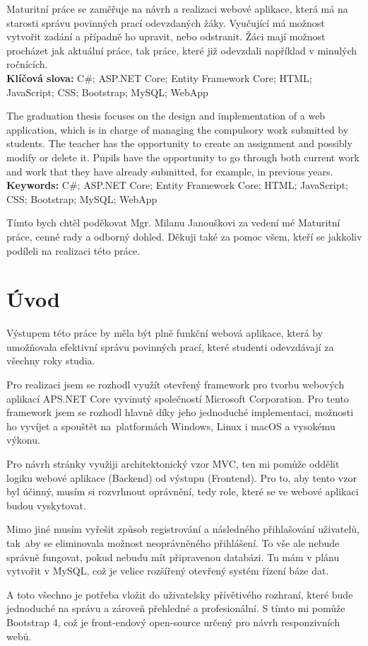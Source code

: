 \documentclass[a4paper, 12pt]{report}
\begin{document}
	\titulniStrana
	
	\anotace Maturitní práce se zaměřuje na návrh a realizaci webové aplikace, která má na starosti správu povinných prací odevzdaných žáky. Vyučující má možnost vytvořit zadání a případně ho upravit, nebo odstranit. Žáci mají možnost procházet jak aktuální práce, tak práce, které již odevzdali například v minulých ročnících. \\
	\textbf{Klíčová slova: } C\#; ASP.NET Core; Entity Framework Core; HTML; JavaScript; CSS; Bootstrap; MySQL; WebApp

	\annotation The graduation thesis focuses on the design and implementation of a web application, which is in charge of managing the compulsory work submitted by students. The teacher has the opportunity to create an assignment and possibly modify or delete it. Pupils have the opportunity to go through both current work and work that they have already submitted, for example, in previous years.\\
	\textbf{Keywords: } C\#; ASP.NET Core; Entity Framework Core; HTML; JavaScript; CSS; Bootstrap; MySQL; WebApp

	\podekovani Tímto bych chtěl poděkovat Mgr. Milanu Janouškovi za vedení mé Maturitní práce, cenné rady a odborný dohled. Děkuji také za pomoc všem, kteří se jakkoliv podíleli na realizaci této práce.
	
	\obsah

	\chapter{Úvod}
    Výstupem této práce by měla být plně funkční webová aplikace, která by umožňovala efektivní správu povinných prací, které studenti odevzdávají za všechny roky studia.\par
	Pro realizaci jsem se rozhodl využít otevřený framework pro tvorbu webových aplikací APS.NET Core vyvinutý společností Microsoft Corporation. Pro tento framework jsem se rozhodl hlavně díky jeho jednoduché implementaci, možnosti ho vyvíjet a spouštět na~platformách Windows, Linux i macOS a vysokému výkonu.\par
	Pro návrh stránky využiji architektonický vzor MVC, ten mi pomůže oddělit logiku webové aplikace (Backend) od výstupu (Frontend). Pro to, aby tento vzor byl účinný, musím si rozvrhnout oprávnění, tedy role, které se ve webové aplikaci budou vyskytovat.\par
	Mimo jiné musím vyřešit způsob registrování a následného přihlašování uživatelů, tak~aby se eliminovala možnost neoprávněného přihlášení. To vše ale nebude správně fungovat, pokud nebudu mít připravenou databázi. Tu mám v plánu vytvořit v MySQL, což je velice rozšířený otevřený systém řízení báze dat.\par
	A toto všechno je potřeba vložit do uživatelsky přívětivého rozhraní, které bude jednoduché na správu a zároveň přehledné a profesionální. S tímto mi pomůže Bootstrap 4, což je front-endový open-source určený pro návrh responzivních webů.
\end{document}
